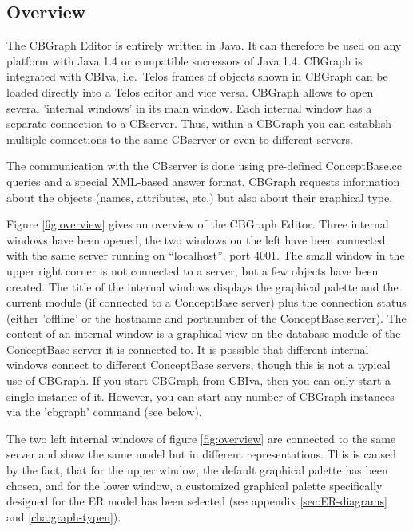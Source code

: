 \subsection{Overview}

The CBGraph Editor is entirely written in Java. It can
therefore be used on any platform with Java 1.4 or compatible successors of Java 1.4.
CBGraph is integrated with CBIva, i.e.\ Telos frames
of objects shown in CBGraph can be loaded directly
into a Telos editor and vice versa. CBGraph allows to open
several 'internal windows' in its main window. Each internal window has a separate
connection to a CBserver. Thus, within a CBGraph
you can establish multiple connections to the same CBserver or even to
different servers.

The communication with the CBserver is done using pre-defined
ConceptBase.cc queries and a special XML-based answer format.
CBGraph requests information about the objects (names, attributes, etc.)
but also about their graphical type.


Figure \ref{fig:overview} gives an
overview of the CBGraph Editor. Three internal windows
have been opened, the two windows on the left have been connected
with the same server running on ``localhost'', port 4001. The small
window in the upper right corner is not connected to a server, but
a few objects have been created. The title of the internal windows 
displays the graphical palette and the current module (if connected
to a ConceptBase server) plus the connection status (either 'offline'
or the hostname and portnumber of the ConceptBase server). The content of
an internal window is a graphical view on the database module of the
ConceptBase server it is connected to. It is possible that different
internal windows connect to different ConceptBase servers, though this
is not a typical use of CBGraph. If you start CBGraph from CBIva, then
you can only start a single instance of it. However, you can start any
number of CBGraph instances via the 'cbgraph' command (see below).


The two left internal windows of figure \ref{fig:overview} are connected to the same
server and show the same model but in different representations. This is caused by the fact,
that for the upper window, the default graphical palette has been
chosen, and for the lower window, a customized graphical palette specifically
designed for the ER model has been selected (see appendix \ref{sec:ER-diagrams}
and \ref{cha:graph-typen}).

